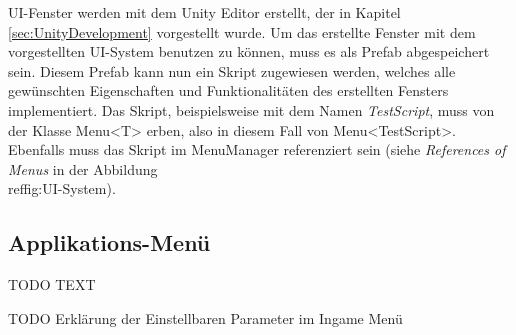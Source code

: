UI-Fenster werden mit dem Unity Editor erstellt, der in Kapitel \ref{sec:UnityDevelopment} vorgestellt wurde. Um das erstellte Fenster mit dem vorgestellten UI-System benutzen zu können, muss es als Prefab abgespeichert sein. Diesem Prefab kann nun ein Skript zugewiesen werden, welches alle gewünschten Eigenschaften und Funktionalitäten des erstellten Fensters implementiert. Das Skript, beispielsweise mit dem Namen \textit{TestScript}, muss von der Klasse Menu<T> erben, also in diesem Fall von Menu<TestScript>. Ebenfalls muss das Skript im MenuManager referenziert sein (siehe \textit{References of Menus} in der Abbildung \\ref{fig:UI-System}).

\subsection{Applikations-Menü}
\label{sec:AppMenu}
TODO TEXT

TODO Erklärung der Einstellbaren Parameter im Ingame Menü

